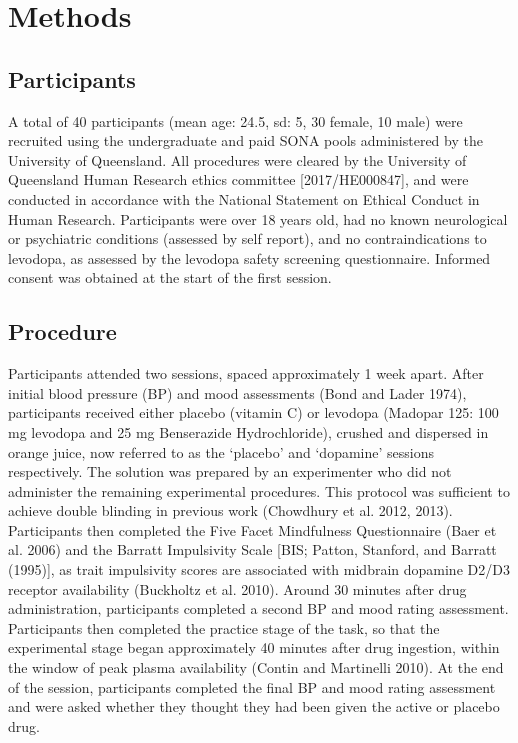 \documentclass{article}
\begin{document}
\hypertarget{methods}{%
\section{Methods}\label{methods}}

\label{sec:Methods}

\hypertarget{participants}{%
\subsection{Participants}\label{participants}}

A total of 40 participants (mean age: 24.5, sd: 5, 30 female, 10 male)
were recruited using the undergraduate and paid SONA pools administered
by the University of Queensland. All procedures were cleared by the
University of Queensland Human Research ethics committee
{[}2017/HE000847{]}, and were conducted in accordance with the National
Statement on Ethical Conduct in Human Research. Participants were over
18 years old, had no known neurological or psychiatric conditions
(assessed by self report), and no contraindications to levodopa, as
assessed by the levodopa safety screening questionnaire. Informed
consent was obtained at the start of the first session.

\hypertarget{procedure}{%
\subsection{Procedure}\label{procedure}}

Participants attended two sessions, spaced approximately 1 week apart.
After initial blood pressure (BP) and mood assessments (Bond and Lader
1974), participants received either placebo (vitamin C) or levodopa
(Madopar 125: 100 mg levodopa and 25 mg Benserazide Hydrochloride),
crushed and dispersed in orange juice, now referred to as the `placebo'
and `dopamine' sessions respectively. The solution was prepared by an
experimenter who did not administer the remaining experimental
procedures. This protocol was sufficient to achieve double blinding in
previous work (Chowdhury et al. 2012, 2013). Participants then completed
the Five Facet Mindfulness Questionnaire (Baer et al. 2006) and the
Barratt Impulsivity Scale {[}BIS; Patton, Stanford, and Barratt
(1995){]}, as trait impulsivity scores are associated with midbrain
dopamine D2/D3 receptor availability (Buckholtz et al. 2010). Around 30
minutes after drug administration, participants completed a second BP
and mood rating assessment. Participants then completed the practice
stage of the task, so that the experimental stage began approximately 40
minutes after drug ingestion, within the window of peak plasma
availability (Contin and Martinelli 2010). At the end of the session,
participants completed the final BP and mood rating assessment and were
asked whether they thought they had been given the active or placebo
drug.
\end{document}
